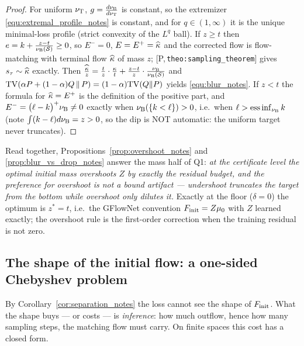 \documentclass[11pt]{article}
\theoremstyle{definition}
\theoremstyle{remark}
\newcommand{\paperref}[1]{[P,\,\texttt{#1}]}   %
\begin{document}
\begin{proof}
For uniform $\nu_{\mathrm{T}}$, $g=\frac{d\nu_{\mathrm{B}}}{d\nu_{\mathrm{T}}}$ is constant, so the extremizer
\eqref{equ:extremal_profile_notes} is constant, and for $q\in(1,\infty)$ it is the unique
minimal-loss profile (strict convexity of the $L^q$ ball). If $z\geq t$ then
$e=k+\frac{z-t}{\nu_{\mathrm{B}}(\mathcal S)}\geq0$, so $E^-=0$, $E=E^+=\widehat{\kappa}$ and the
corrected flow is flow-matching with terminal flow $\widehat{\kappa}$ of mass $z$;
\paperref{theo:sampling\_theorem} gives $s_\tau\sim\widehat{\kappa}$ exactly. Then
$\frac{\widehat{\kappa}}{z}=\frac tz\cdot\frac{\kappa} t+\frac{z-t}{z}\cdot
\frac{\nu_{\mathrm{B}}}{\nu_{\mathrm{B}}(\mathcal S)}$ and
$\mathrm{TV}(\alpha P+(1-\alpha)Q\,\|\,P)=(1-\alpha)\mathrm{TV}(Q\|P)$ yields \eqref{equ:blur_notes}. If $z<t$
the formula for $\widehat{\kappa}=E^+$ is the definition of the positive part, and
$E^-=\bigl(\ell-k\bigr)^+\nu_{\mathrm{B}}\neq0$ exactly when $\nu_{\mathrm{B}}(\{k<\ell\})>0$, i.e.\
when $\ell>\operatorname*{ess\,inf}_{\nu_{\mathrm{B}}} k$ (note $\int(k-\ell)d\nu_{\mathrm{B}}=z>0$, so
the dip is NOT automatic: the uniform target never truncates).
\end{proof}

Read together, Propositions~\ref{prop:overshoot_notes} and \ref{prop:blur_vs_drop_notes} answer the
mass half of Q1: \emph{at the certificate level the optimal initial mass overshoots $Z$ by
exactly the residual budget, and the preference for overshoot is not a bound artifact ---
undershoot truncates the target from the bottom while overshoot only dilutes it.} Exactly
at the floor ($\delta=0$) the optimum is $z^*=t$, i.e.\ the GFlowNet convention
$F_{\mathrm{init}}=Z\mu_0$ with $Z$ learned exactly; the overshoot rule is the first-order correction
when the training residual is not zero.

\subsection{The shape of the initial flow: a one-sided Chebyshev problem}\label{sec:shape_notes}

By Corollary~\ref{cor:separation_notes} the loss cannot see the shape of $F_{\mathrm{init}}$. What the shape
buys --- or costs --- is \emph{inference}: how much outflow, hence how many sampling steps,
the matching flow must carry. On finite spaces this cost has a closed form.
\end{document}
